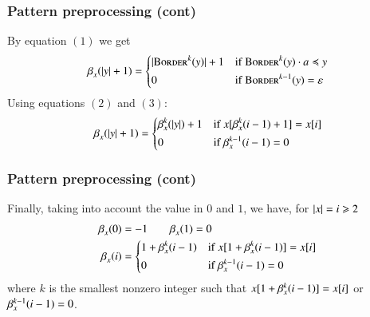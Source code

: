 %
\begin{frame}
\frametitle{Pattern preprocessing (cont)}

By equation \((1)\) we get
\[
\beta_{x}^{}(\lvert{y}\lvert{} + 1) =
\left\{
  \begin{aligned}
  & \lvert{\textsc{Border}^{k}(y)}\lvert{} + 1
  && \text{if} \; \textsc{Border}^{k}(y) \cdot a \preccurlyeq y\\
  & 0
  && \text{if} \; \textsc{Border}^{k-1}(y) = \varepsilon
\end{aligned}
\right.
\]
Using equations \((2)\) and \((3)\):
\[
\beta_{x}^{}(\lvert{y}\lvert{} + 1) =
\left\{
  \begin{aligned}
   & \beta_{x}^{k}(\lvert{y}\lvert{}) + 1
   && \text{if} \; x [\beta_{x}^{k}(i-1) + 1] = x [i]\\
   & 0
   && \text{if} \; \beta_{x}^{k-1}(i-1) = 0
\end{aligned}
\right.
\]
\end{frame}

%
\begin{frame}
\frametitle{Pattern preprocessing (cont)}

Finally, taking into account the value in \(0\) and \(1\), we have, for
\(\lvert{x}\lvert{} = i \geqslant 2\)
\[
\begin{aligned}
  \beta_{x}^{}(0) &= -1 \qquad \beta_{x}^{}(1) = 0\\
\beta_{x}^{}(i) &=
\left\{
\begin{aligned}
& 1 + \beta_{x}^{k}(i-1)
&& \text{if} \; x [1 + \beta_{x}^{k}(i-1)] = x [i]\\
& 0
&& \text{if} \; \beta_{x}^{k-1}(i-1) = 0
\end{aligned}
\right.
\end{aligned}
\]
where \(k\) is the smallest nonzero integer such that
\(x[1+\beta_{x}^{k}(i-1)] = x[i]\) or \(\beta_{x}^{k-1}(i-1) =
0\).

\end{frame}

